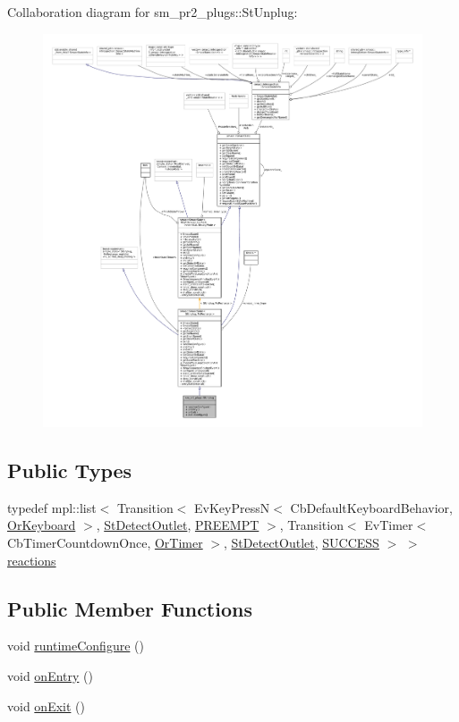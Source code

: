 Collaboration diagram for sm\+\_\+pr2\+\_\+plugs\+:\+:St\+Unplug\+:
\nopagebreak
\begin{figure}[H]
\begin{center}
\leavevmode
\includegraphics[width=350pt]{structsm__pr2__plugs_1_1StUnplug__coll__graph}
\end{center}
\end{figure}
\subsection*{Public Types}
\begin{DoxyCompactItemize}
\item 
typedef mpl\+::list$<$ Transition$<$ Ev\+Key\+PressN$<$ Cb\+Default\+Keyboard\+Behavior, \hyperlink{classsm__pr2__plugs_1_1OrKeyboard}{Or\+Keyboard} $>$, \hyperlink{structsm__pr2__plugs_1_1StDetectOutlet}{St\+Detect\+Outlet}, \hyperlink{classPREEMPT}{P\+R\+E\+E\+M\+PT} $>$, Transition$<$ Ev\+Timer$<$ Cb\+Timer\+Countdown\+Once, \hyperlink{classsm__pr2__plugs_1_1OrTimer}{Or\+Timer} $>$, \hyperlink{structsm__pr2__plugs_1_1StDetectOutlet}{St\+Detect\+Outlet}, \hyperlink{classSUCCESS}{S\+U\+C\+C\+E\+SS} $>$ $>$ \hyperlink{structsm__pr2__plugs_1_1StUnplug_a5e2311ff9af5d5f6391dc9bec1cb477f}{reactions}
\end{DoxyCompactItemize}
\subsection*{Public Member Functions}
\begin{DoxyCompactItemize}
\item 
void \hyperlink{structsm__pr2__plugs_1_1StUnplug_a9a9dac6ed575453e3bbfb115f99277be}{runtime\+Configure} ()
\item 
void \hyperlink{structsm__pr2__plugs_1_1StUnplug_a9c662e3a8145efd71cfdb73a66c4eefd}{on\+Entry} ()
\item 
void \hyperlink{structsm__pr2__plugs_1_1StUnplug_a4d6f2b2c10aaee954441ef36356fa364}{on\+Exit} ()
\end{DoxyCompactItemize}

